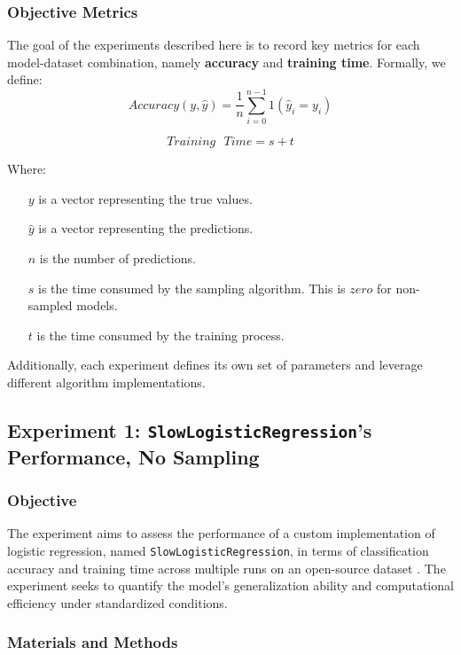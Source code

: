 \documentclass{article}
\theoremstyle{plain}
\theoremstyle{definition}
\theoremstyle{remark}
\begin{document}
\subsubsection{Objective Metrics}

The goal of the experiments described here is to record key metrics for each model-dataset combination, namely \textbf{accuracy} and \textbf{training time}. Formally, we define:
$$
Accuracy(y, \hat{y}) = \frac{1}{n} \sum_{i=0}^{n-1} 1(\hat{y}_i = y_i)
$$

$$
Training\text{ }Time = s + t
$$

Where:

\begin{itemize}

\item[$y$] is a vector representing the true values.
\item[$\hat{y}$] is a vector representing the predictions.
\item[$n$] is the number of predictions.
\item[$s$] is the time consumed by the sampling algorithm. This is $zero$ for non-sampled models.
\item[$t$] is the time consumed by the training process.

\end{itemize}

Additionally, each experiment defines its own set of parameters and leverage different algorithm implementations.

\subsection{Experiment 1: \texttt{SlowLogisticRegression}'s Performance, No Sampling}


\subsubsection{Objective}

The experiment aims to assess the performance of a custom implementation of logistic regression, named \texttt{SlowLogisticRegression}, in terms of classification accuracy and training time across multiple runs on an open-source dataset \cite{breastcancer}. The experiment seeks to quantify the model's generalization ability and computational efficiency under standardized conditions.


\subsubsection{Materials and Methods}
\end{document}
